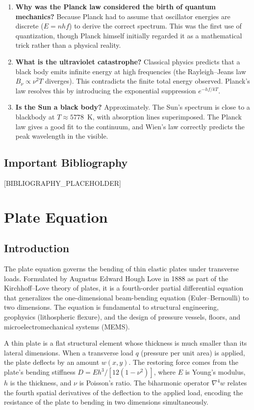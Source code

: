 \documentclass[11pt,openright]{book}
\begin{document}
\begin{enumerate}
\item \textbf{Why was the Planck law considered the birth of quantum mechanics?}
Because Planck had to assume that oscillator energies are discrete ($E = nhf$) to derive the correct spectrum. This was the first use of quantization, though Planck himself initially regarded it as a mathematical trick rather than a physical reality.

\item \textbf{What is the ultraviolet catastrophe?}
Classical physics predicts that a black body emits infinite energy at high frequencies (the Rayleigh--Jeans law $B_{\nu} \propto \nu^{2}T$ diverges). This contradicts the finite total energy observed. Planck's law resolves this by introducing the exponential suppression $e^{-hf/kT}$.

\item \textbf{Is the Sun a black body?}
Approximately. The Sun's spectrum is close to a blackbody at $T \approx 5778$~K, with absorption lines superimposed. The Planck law gives a good fit to the continuum, and Wien's law correctly predicts the peak wavelength in the visible.
\end{enumerate}
\section*{Important Bibliography}

[BIBLIOGRAPHY_PLACEHOLDER]


\chapter{Plate Equation}

\section*{Introduction}

The plate equation governs the bending of thin elastic plates under transverse loads. Formulated by Augustus Edward Hough Love in 1888 as part of the Kirchhoff--Love theory of plates, it is a fourth-order partial differential equation that generalizes the one-dimensional beam-bending equation (Euler--Bernoulli) to two dimensions. The equation is fundamental to structural engineering, geophysics (lithospheric flexure), and the design of pressure vessels, floors, and microelectromechanical systems (MEMS).

A thin plate is a flat structural element whose thickness is much smaller than its lateral dimensions. When a transverse load $q$ (pressure per unit area) is applied, the plate deflects by an amount $w(x,y)$. The restoring force comes from the plate's bending stiffness $D = Eh^{3}/[12(1-\nu^{2})]$, where $E$ is Young's modulus, $h$ is the thickness, and $\nu$ is Poisson's ratio. The biharmonic operator $\nabla^{4}w$ relates the fourth spatial derivatives of the deflection to the applied load, encoding the resistance of the plate to bending in two dimensions simultaneously.
\end{document}
